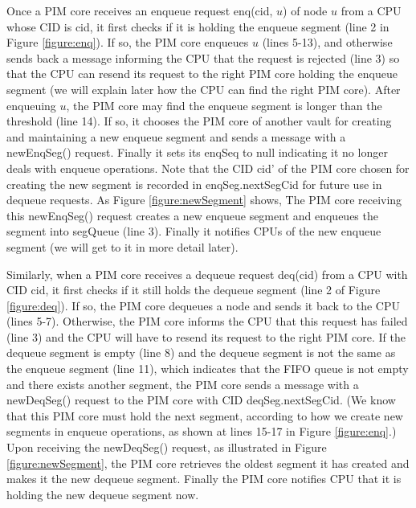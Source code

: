 Once a PIM core receives an enqueue request enq(cid, $u$) of node $u$ from a CPU whose CID is cid,
it first checks if it is holding the enqueue segment (line 2 in Figure \ref{figure:enq}).
If so, the PIM core enqueues $u$ (lines 5-13), and otherwise sends back a message
informing the CPU that the request is rejected (line 3) so that
the CPU can resend its request to the right PIM core holding the enqueue segment
(we will explain later how the CPU can find the right PIM core).
After enqueuing $u$, the PIM core may find the enqueue segment is longer than the threshold (line 14).
If so, it chooses the PIM core of another vault for creating and maintaining a new enqueue segment 
and sends a message with a newEnqSeg() request.
Finally it sets its enqSeq to null indicating it no longer deals with enqueue operations.
Note that the CID cid' of the PIM core chosen for creating the new segment is recorded in 
enqSeg.nextSegCid for future use in dequeue requests.
As Figure \ref{figure:newSegment} shows,
The PIM core receiving this newEnqSeg() request creates a new enqueue segment and enqueues 
the segment into segQueue (line 3). 
Finally it notifies CPUs of the new enqueue segment (we will get to it in more detail later).

Similarly, when a PIM core receives a dequeue request deq(cid) from a CPU with CID cid,
it first checks if it still holds the dequeue segment (line 2 of Figure \ref{figure:deq}).
If so, the PIM core dequeues a node and sends it back to the CPU (lines 5-7).
Otherwise, the PIM core informs the CPU that this request has failed (line 3) and
the CPU will have to resend its request to the right PIM core.
If the dequeue segment is empty (line 8) and the dequeue segment is not the same as 
the enqueue segment (line 11), which indicates that the FIFO queue is not empty 
and there exists another segment, the PIM core sends a message with a newDeqSeg() request 
to the PIM core with CID deqSeg.nextSegCid. 
(We know that this PIM core must hold the next segment, 
according to how we create new segments in enqueue operations, 
as shown at lines 15-17 in Figure \ref{figure:enq}.) 
Upon receiving the newDeqSeg() request, as illustrated in Figure \ref{figure:newSegment}, 
the PIM core retrieves the oldest segment it has created and makes it the new dequeue segment.    Finally the PIM core notifies CPU that it is holding the new dequeue segment now.

